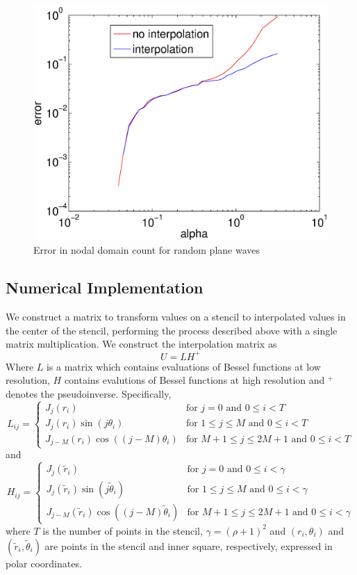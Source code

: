 \documentclass{report}
\begin{document}
\begin{figure}
  \begin{center}
    \includegraphics[width=\textwidth]{figs/interpolation/rpw_errors.eps}
    \caption{Error in nodal domain count for random plane waves}
    \label{fig:rpw_count_errors}
  \end{center}
\end{figure}

\subsection{Numerical Implementation}
We construct a matrix to transform values on a stencil to interpolated values in the center of the stencil, performing the process described above with a single matrix multiplication. We construct the interpolation matrix as
\[
U = L H^{+}
\]
Where $L$ is a matrix which contains evaluations of Bessel functions at low resolution, $H$ contains evalutions of Bessel functions at high resolution and $^{+}$ denotes the pseudoinverse. Specifically,
\[
L_{ij} =\begin{cases}
J_{j}(r_{i}) & \text{for } j = 0 \text{ and } 0 \le i < T\\
J_{j}(r_{i}) \sin{(j \theta_{i})} & \text{for } 1 \le j \le M \text{ and } 0 \le i < T\\
J_{j-M}(r_{i}) \cos{((j-M) \theta_{i})} & \text{for } M+1 \le j \le 2M+1 \text{ and } 0 \le i < T
\end{cases}
\]
and
\[
H_{ij} =\begin{cases}
J_{j}(\tilde{r}_{i}) & \text{for } j = 0 \text{ and } 0 \le i < \gamma\\
J_{j}(\tilde{r}_{i}) \sin{(j \tilde{\theta}_{i})} & \text{for } 1 \le j \le M \text{ and } 0 \le i < \gamma\\
J_{j-M}(\tilde{r}_{i}) \cos{((j-M) \tilde{\theta}_{i})} & \text{for } M+1 \le j \le 2M+1 \text{ and } 0 \le i < \gamma
\end{cases}
\]
where $T$ is the number of points in the stencil, $\gamma = (\rho + 1)^{2}$ and $(r_{i},\theta_{i})$ and $(\tilde{r}_{i},\tilde{\theta}_{i})$ are points in the stencil and inner square, respectively, expressed in polar coordinates.
\end{document}
